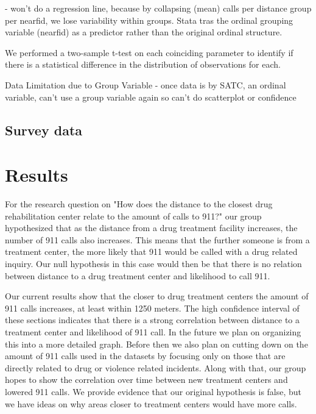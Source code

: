 \documentclass[12pt]{article}
\begin{document}
- won't do a regression line, because by collapsing (mean) calls per distance group per nearfid, we lose variability within groups. Stata tras the ordinal grouping variable (nearfid) as a predictor rather than the original ordinal structure. 

We performed a two-sample t-test on each coinciding parameter to identify if there is a statistical difference in the distribution of observations for each. 


Data Limitation due to Group Variable - once data is by SATC, an ordinal variable, can't use a group variable again so can't do scatterplot or confidence

\subsection{Survey data}

\section{Results}
For the research question on "How does the distance to the closest drug rehabilitation center relate to the amount of calls to 911?" our group hypothesized that as the distance from a drug treatment facility increases, the number of 911 calls also increases. This means that the further someone is from a treatment center, the more  likely that 911 would be called with a drug related inquiry. Our null hypothesis in this case would then be that there is no relation between distance to a drug treatment center and likelihood to call 911. 

Our current results show that the closer to drug treatment centers the  amount of 911 calls increases, at least within 1250 meters. The high confidence interval of these sections indicates that there is a strong correlation between distance to a treatment center and likelihood of 911 call. In the future we plan on organizing this into a more detailed graph. Before then we also plan on cutting down on the amount of 911 calls used in the datasets by focusing only on those that are directly related to drug or violence related incidents. Along with that, our group hopes to show the correlation over time between new treatment centers and lowered 911 calls. We provide evidence that our original hypothesis is false, but we have ideas on why areas closer to treatment centers would have more calls.
\end{document}
